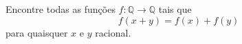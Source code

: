 Encontre todas as funções $f: \mathbb{Q} \to \mathbb{Q}$ tais que
$$ f(x+y) = f(x) + f(y)$$
para quaisquer $x$ e $y$ racional.

